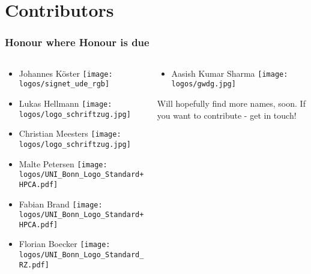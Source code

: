 \section{Contributors}

\begin{frame}
  \frametitle{Honour where Honour is due}
  \begin{columns}
  	\begin{column}{.5\textwidth}
  	   \begin{itemize}
  	   	\item Johannes Köster \texttt{[image: logos/signet\_ude\_rgb]}
  	   	\item Lukas Hellmann \texttt{[image: logos/logo\_schriftzug.jpg]}
  	   	\item Christian Meesters \texttt{[image: logos/logo\_schriftzug.jpg]}
  	   	\item Malte Petersen \texttt{[image: logos/UNI\_Bonn\_Logo\_Standard+HPCA.pdf]}
  	   	\item Fabian Brand \texttt{[image: logos/UNI\_Bonn\_Logo\_Standard+HPCA.pdf]}
  	   	\item Florian Boecker \texttt{[image: logos/UNI\_Bonn\_Logo\_Standard\_RZ.pdf]}
  	   \end{itemize}	
  	\end{column}
    \begin{column}{.5\textwidth}
      \begin{itemize}
    	\item Aasish Kumar Sharma \texttt{[image: logos/gwdg.jpg]}
      \end{itemize}

    			Will hopefully find more names, soon. If you want to contribute - get in touch!
  
    \end{column}
  \end{columns}
		
\end{frame}

